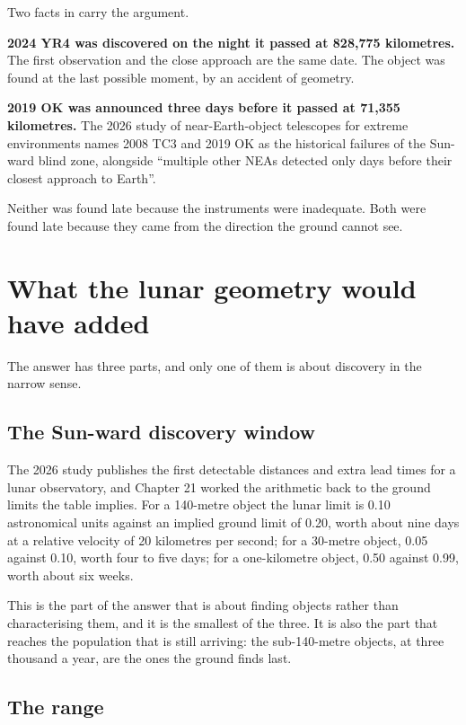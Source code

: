 Two facts in  carry the argument.

\textbf{2024 YR4 was discovered on the night it passed at 828,775
kilometres.} The first observation and the close approach are the same date.
The object was found at the last possible moment, by an accident of
geometry.

\textbf{2019 OK was announced three days before it passed at 71,355
kilometres.} The 2026 study of near-Earth-object telescopes for extreme
environments names 2008 TC3 and 2019 OK as the historical failures of the
Sun-ward blind zone, alongside ``multiple other NEAs detected only days
before their closest approach to Earth''.

Neither was found late because the instruments were inadequate. Both were
found late because they came from the direction the ground cannot see.

\section{What the lunar geometry would have added}

The answer has three parts, and only one of them is about discovery in the
narrow sense.

\subsection{The Sun-ward discovery window}

The 2026 study publishes the first detectable distances and extra lead
times for a lunar observatory, and Chapter 21 worked the arithmetic back to
the ground limits the table implies. For a 140-metre object the lunar limit
is 0.10 astronomical units against an implied ground limit of 0.20, worth
about nine days at a relative velocity of 20 kilometres per second; for a
30-metre object, 0.05 against 0.10, worth four to five days; for a
one-kilometre object, 0.50 against 0.99, worth about six weeks.

This is the part of the answer that is about finding objects rather than
characterising them, and it is the smallest of the three. It is also the
part that reaches the population that is still arriving: the sub-140-metre
objects, at three thousand a year, are the ones the ground finds last.

\subsection{The range}

